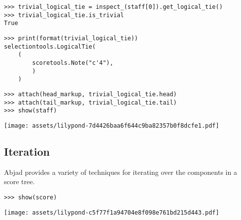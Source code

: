 \begin{comment}
<abjad>
trivial_logical_tie = inspect_(staff[0]).get_logical_tie()
trivial_logical_tie.is_trivial
print(format(trivial_logical_tie))
attach(head_markup, trivial_logical_tie.head)
attach(tail_markup, trivial_logical_tie.tail)
show(staff)
</abjad>
\end{comment}

\begin{abjadbookoutput}
\begin{singlespacing}
\vspace{-0.5\baselineskip}
\begin{verbatim}
>>> trivial_logical_tie = inspect_(staff[0]).get_logical_tie()
>>> trivial_logical_tie.is_trivial
True
\end{verbatim}
\begin{verbatim}
>>> print(format(trivial_logical_tie))
selectiontools.LogicalTie(
    (
        scoretools.Note("c'4"),
        )
    )
\end{verbatim}
\begin{verbatim}
>>> attach(head_markup, trivial_logical_tie.head)
>>> attach(tail_markup, trivial_logical_tie.tail)
>>> show(staff)
\end{verbatim}
\noindent\texttt{[image: assets/lilypond-7d4426baa6f644c9ba82357b0f8dcfe1.pdf]}
\end{singlespacing}
\end{abjadbookoutput}

\noindent

\subsection{Iteration}
\label{ssec:iteration}

Abjad provides a variety of techniques for iterating over the components in a
score tree.

\begin{comment}
<abjad>
show(score)
</abjad>
\end{comment}

\begin{abjadbookoutput}
\begin{singlespacing}
\vspace{-0.5\baselineskip}
\begin{verbatim}
>>> show(score)
\end{verbatim}
\noindent\texttt{[image: assets/lilypond-c5f77f1a94704e8f098e761bd215d443.pdf]}
\end{singlespacing}
\end{abjadbookoutput}


